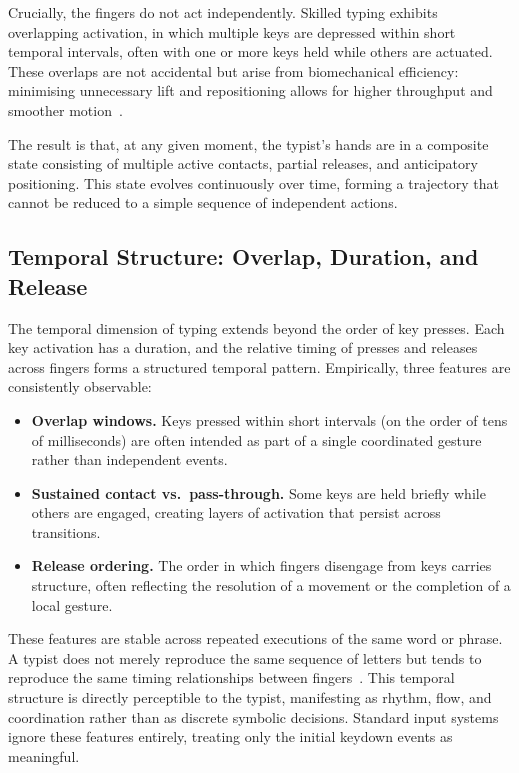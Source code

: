 \documentclass[11pt, a4paper]{article}
\begin{document}
Crucially, the fingers do not act independently. Skilled typing exhibits
overlapping activation, in which multiple keys are depressed within short
temporal intervals, often with one or more keys held while others are
actuated. These overlaps are not accidental but arise from biomechanical
efficiency: minimising unnecessary lift and repositioning allows for
higher throughput and smoother motion~\cite{schieber2001}.

The result is that, at any given moment, the typist's hands are in a
composite state consisting of multiple active contacts, partial releases,
and anticipatory positioning. This state evolves continuously over time,
forming a trajectory that cannot be reduced to a simple sequence of
independent actions.

\subsection{Temporal Structure: Overlap, Duration, and Release}

The temporal dimension of typing extends beyond the order of key presses.
Each key activation has a duration, and the relative timing of presses
and releases across fingers forms a structured temporal pattern.
Empirically, three features are consistently observable:

\begin{itemize}[leftmargin=2em]
  \item \textbf{Overlap windows.} Keys pressed within short intervals (on
    the order of tens of milliseconds) are often intended as part of a
    single coordinated gesture rather than independent events.
  \item \textbf{Sustained contact vs.\ pass-through.} Some keys are held
    briefly while others are engaged, creating layers of activation that
    persist across transitions.
  \item \textbf{Release ordering.} The order in which fingers disengage
    from keys carries structure, often reflecting the resolution of a
    movement or the completion of a local gesture.
\end{itemize}

These features are stable across repeated executions of the same word or
phrase. A typist does not merely reproduce the same sequence of letters
but tends to reproduce the same timing relationships between
fingers~\cite{monrose2000,gunetti2005}. This temporal structure is
directly perceptible to the typist, manifesting as rhythm, flow, and
coordination rather than as discrete symbolic decisions. Standard input
systems ignore these features entirely, treating only the initial keydown
events as meaningful.
\end{document}

